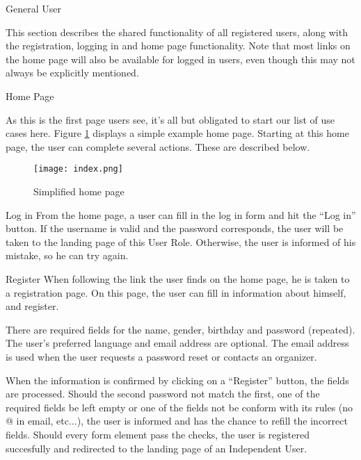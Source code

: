
\begin{section}{General User}

    This section describes the shared functionality of all registered users,
    along with the registration, logging in and home page functionality. Note
    that most links on the home page will also be available for logged in users,
    even though this may not always be explicitly mentioned.

    \begin{subsection}{Home Page}

        As this is the first page users see, it's all but obligated to start our
        list of use cases here. Figure \ref{img:index} displays a simple example
        home page. Starting at this home page, the user can complete several
        actions. These are described below.

        \begin{figure}[h]
            \centering
            \texttt{[image: index.png]}
            \caption{Simplified home page}
            \label{img:index}
        \end{figure}

        \begin{subsubsection}{Log in}
            From the home page, a user can fill in the log in form and hit the
            ``Log in'' button. If the username is valid and the password
            corresponds, the user will be taken to the landing page of this User
            Role. Otherwise, the user is informed of his mistake, so he can try
            again.
        \end{subsubsection}

        \begin{subsubsection}{Register}
            When following the link the user finds on the home page, he is taken
            to a registration page. On this page, the user can fill in
            information about himself, and register.

            There are required fields for the name, gender, birthday and
            password (repeated). The user's preferred language and
            email address are optional. The email address is used when the user
            requests a password reset or contacts an organizer.

            When the information is confirmed by clicking on a ``Register''
            button, the fields are processed. Should the second password not
            match the first, one of the required fields be left empty or one of
            the fields not be conform with its rules (no @ in email, etc...), the
            user is informed and has the chance to refill the incorrect fields.
            Should every form element pass the checks, the user is registered
            succesfully and redirected to the landing page of an Independent
            User.
        \end{subsubsection}


\end{subsection}
\end{section}
